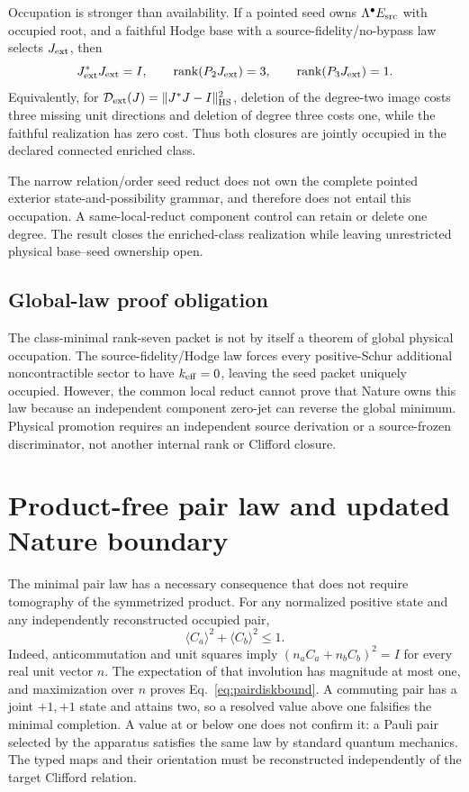 \documentclass[11pt]{article}
\begin{document}
Occupation is stronger than availability.  If a pointed seed owns
$\Lambda^\bullet E_{\rm src}$ with occupied root, and a faithful Hodge base
with a source-fidelity/no-bypass law selects $J_{\rm ext}$, then
\[
 J_{\rm ext}^*J_{\rm ext}=I,
 \qquad
 \operatorname{rank}(P_2J_{\rm ext})=3,
 \qquad
 \operatorname{rank}(P_3J_{\rm ext})=1.
\]
Equivalently, for
$\mathcal D_{\rm ext}(J)=\|J^*J-I\|_{\rm HS}^2$, deletion of the degree-two
image costs three missing unit directions and deletion of degree three costs
one, while the faithful realization has zero cost.  Thus both closures are
jointly occupied in the declared connected enriched class.

The narrow relation/order seed reduct does not own the complete pointed
exterior state-and-possibility grammar, and therefore does not entail this
occupation.  A same-local-reduct component control can retain or delete one
degree.  The result closes the enriched-class realization while leaving
unrestricted physical base--seed ownership open.

\subsection*{Global-law proof obligation}

The class-minimal rank-seven packet is not by itself a theorem of global
physical occupation.  The source-fidelity/Hodge law forces every
positive-Schur additional noncontractible sector to have
\(k_{\rm eff}=0\), leaving the seed packet uniquely occupied.  However, the
common local reduct cannot prove that Nature owns this law because an
independent component zero-jet can reverse the global minimum.  Physical
promotion requires an independent source derivation or a source-frozen
discriminator, not another internal rank or Clifford closure.

\section{Product-free pair law and updated Nature boundary}

The minimal pair law has a necessary consequence that does not require
tomography of the symmetrized product. For any normalized positive state and
any independently reconstructed occupied pair,
\begin{equation}
 \boxed{\langle C_a\rangle^2+\langle C_b\rangle^2\leq1.}
 \label{eq:pairdiskbound}
\end{equation}
Indeed, anticommutation and unit squares imply
$(n_aC_a+n_bC_b)^2=I$ for every real unit vector $n$. The expectation of
that involution has magnitude at most one, and maximization over $n$ proves
Eq.~\eqref{eq:pairdiskbound}. A commuting pair has a joint $+1,+1$ state and
attains two, so a resolved value above one falsifies the minimal completion.
A value at or below one does not confirm it: a Pauli pair selected by the
apparatus satisfies the same law by standard quantum mechanics. The typed
maps and their orientation must be reconstructed independently of the target
Clifford relation.
\end{document}
